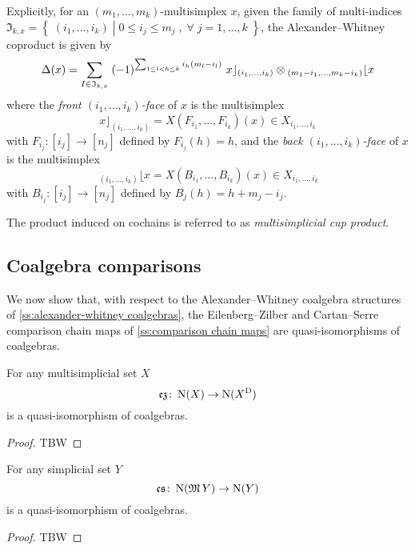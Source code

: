 Explicitly, for an $(m_1, \dots, m_k)$-multisimplex $x$, given the family of multi-indices $\mathfrak{I}_{k,x}=\left\lbrace \; (i_{1},\dots,i_{k}) \; \left| \; 0\le i_{j} \le m_{j} \; , \;  \forall \; j=1,\dots,k \; \right.  \right\rbrace $,  the Alexander--Whitney coproduct is given by
\[
\operatorname{\Delta}(x) =
\sum_{I\in \mathfrak{I}_{k,x}} \;
(-1)^{\sum_{1 \leq l<h \leq k} i_h (m_l-i_l) } \
x \rfloor_{(i_{1},\dots,i_{k})} \otimes
\!\,_{(m_{1}-i_{1}, \dots, m_{k}-i_{k})} \lfloor x
\]
where the \textit{front $(i_1, \dots, i_k)$-face} of $x$ is the multisimplex
\[
x \rfloor_{(i_{1}, \dots, i_{k})} =
X(F_{i_1}, \dots, F_{i_k})(x) \in X_{i_1, \dots, i_k}
\]
with
$F_{i_j} \colon [i_j] \to [n_j]$ defined by $F_{i_j}(h)=h$, and the \textit{back $(i_1, \dots, i_k)$-face} of $x$ is the multisimplex
\[
\,_{(i_{1}, \dots, i_{k})} \lfloor x =
X(B_{i_1}, \dots, B_{i_k})(x) \in X_{i_1, \dots, i_k}
\]
with $B_{i_j} \colon [i_j] \to [n_j]$ defined by $B_j(h) = h+m_j-i_j$.

The product induced on cochains is referred to as \textit{multisimplicial cup product}.

\subsection{Coalgebra comparisons}

We now show that, with respect to the Alexander--Whitney coalgebra structures of \cref{ss:alexander-whitney coalgebras}, the Eilenberg--Zilber and Cartan--Serre comparison chain maps of \cref{ss:comparison chain maps} are quasi-isomorphisms of coalgebras.

\begin{theorem}
	For any multisimplicial set $X$
	\[
	\operatorname{\mathfrak{ez}} \colon \operatorname{N}(X) \to \operatorname{N}(X^{\mathrm{D}})
	\]
	is a quasi-isomorphism of coalgebras.
\end{theorem}

\begin{proof}
	TBW 
\end{proof}

\begin{theorem}
	For any simplicial set $Y$
	\[
	\operatorname{\mathfrak{cs}} \colon \operatorname{N}(\operatorname{\mathfrak{M}} Y) \to \operatorname{N}(Y)
	\]
	is a quasi-isomorphism of coalgebras.
\end{theorem}

\begin{proof}
	TBW 
\end{proof}


